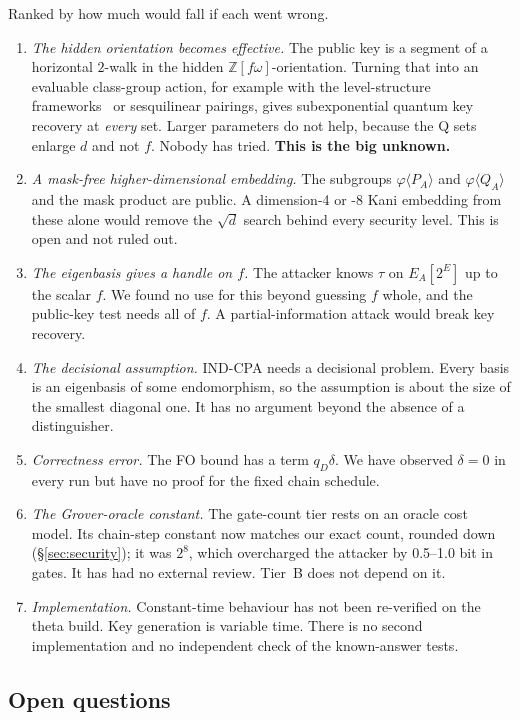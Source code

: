 \documentclass[11pt,a4paper]{article}
\newcommand{\Z}{\mathbb{Z}}
\newcommand{\EA}{E_A}
\begin{document}
Ranked by how much would fall if each went wrong.
\begin{enumerate}[label=\textbf{R\arabic*.}]
\item \emph{The hidden orientation becomes effective.} The public key is a
  segment of a horizontal $2$-walk in the hidden $\Z[f\omega]$-orientation.
  Turning that into an evaluable class-group action, for example with the
  level-structure frameworks~\cite{DFP24,Arpin24} or sesquilinear pairings,
  gives subexponential quantum key recovery at \emph{every} set. Larger
  parameters do not help, because the Q sets enlarge $d$ and not $f$.
  Nobody has tried. \textbf{This is the big unknown.}
\item \emph{A mask-free higher-dimensional embedding.} The subgroups
  $\varphi\langle P_A\rangle$ and $\varphi\langle Q_A\rangle$ and the mask
  product are public. A dimension-4 or -8 Kani embedding from these alone
  would remove the $\sqrt d$ search behind every security level. This is
  open and not ruled out.
\item \emph{The eigenbasis gives a handle on $f$.} The attacker knows
  $\tau$ on $\EA[2^E]$ up to the scalar $f$. We found no use for this
  beyond guessing $f$ whole, and the public-key test needs all of $f$. A
  partial-information attack would break key recovery.
\item \emph{The decisional assumption.} IND-CPA needs a decisional problem.
  Every basis is an eigenbasis of some endomorphism, so the assumption is
  about the size of the smallest diagonal one. It has no argument beyond
  the absence of a distinguisher.
\item \emph{Correctness error.} The FO bound has a term $q_D\delta$. We have
  observed $\delta=0$ in every run but have no proof for the fixed chain
  schedule.
\item \emph{The Grover-oracle constant.} The gate-count tier rests on an
  oracle cost model. Its chain-step constant now matches our exact count,
  rounded down (\S\ref{sec:security}); it was $2^8$, which overcharged the
  attacker by 0.5--1.0 bit in gates. It has had no external review. Tier~B
  does not depend on it.
\item \emph{Implementation.} Constant-time behaviour has not been
  re-verified on the theta build. Key generation is variable time. There is
  no second implementation and no independent check of the known-answer
  tests.
\end{enumerate}


\subsection{Open questions}\label{sec:open}
\end{document}
